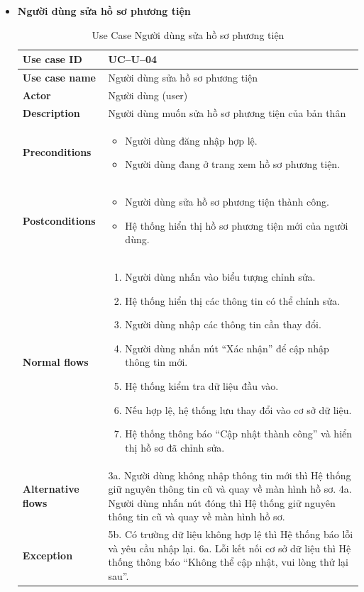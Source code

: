 \begin{itemize}
\item \textbf{Người dùng sửa hồ sơ phương tiện}
\begin{longtable}{|m{}|m{}|}
          \caption{Use Case Người dùng sửa hồ sơ phương tiện} \\
  \hline
  \textbf{Use case ID} & UC--U--04 \\
  \hline
  \textbf{Use case name} & Người dùng sửa hồ sơ phương tiện \\
  \hline
  \textbf{Actor} & Người dùng (user) \\
  \hline
  \textbf{Description} & Người dùng muốn sửa hồ sơ phương tiện của bản thân \\
  \hline
  \textbf{Preconditions} &
  \begin{itemize}
    \item Người dùng đăng nhập hợp lệ.
    \item Người dùng đang ở trang xem hồ sơ phương tiện.
  \end{itemize}\\
  \hline
  \textbf{Postconditions} &
  \begin{itemize}
    \item Người dùng sửa hồ sơ phương tiện thành công.
    \item Hệ thống hiển thị hồ sơ phương tiện mới của người dùng.
  \end{itemize}\\
  \hline
  \textbf{Normal flows} &
  \begin{enumerate}[label=\arabic*.]
    \item Người dùng nhấn vào biểu tượng chỉnh sửa.
    \item Hệ thống hiển thị các thông tin có thể chỉnh sửa.
    \item Người dùng nhập các thông tin cần thay đổi.
    \item Người dùng nhấn nút “Xác nhận” để cập nhập thông tin mới.
    \item Hệ thống kiểm tra dữ liệu đầu vào.
    \item Nếu hợp lệ, hệ thống lưu thay đổi vào cơ sở dữ liệu.
    \item Hệ thống thông báo “Cập nhật thành công” và hiển thị hồ sơ đã chỉnh sửa.
  \end{enumerate}\\
  \hline
  \textbf{Alternative flows} &
  3a. Người dùng không nhập thông tin mới thì Hệ thống giữ nguyên thông tin cũ và quay về màn hình hồ sơ. \newline
  4a. Người dùng nhấn nút đóng thì Hệ thống giữ nguyên thông tin cũ và quay về màn hình hồ sơ.\\
  \hline
  \textbf{Exception} &
  5b. Có trường dữ liệu không hợp lệ thì Hệ thống báo lỗi và yêu cầu nhập lại. \newline
  6a. Lỗi kết nối cơ sở dữ liệu thì Hệ thống thông báo “Không thể cập nhật, vui lòng thử lại sau”.\\
  \hline
  \end{longtable}
\end{itemize}

